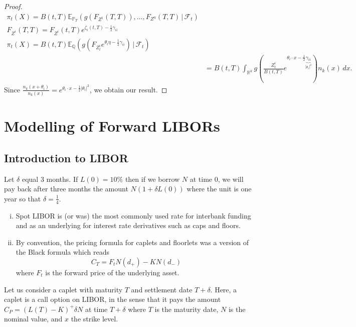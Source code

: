 \documentclass[10pt, oneside, reqno]{amsbook}
\theoremstyle{plain}%
\theoremstyle{definition}
\theoremstyle{remark}
\newcommand{\given}{ \, | \,}
\newcommand{\sigf}{\mathcal{F}}
\newcommand{\Q}{\mathbb{Q}}
\newcommand{\R}{\mathbb{R}}
\newcommand{\E}{\mathbb{E}}
\renewcommand{\P}{\mathbb{P}}
\numberwithin{equation}{chapter}
\begin{document}
\begin{proof}
	\begin{align*}
		\pi_t(X) = B(t, T) \E_{\P_T} \left( g(F_{Z^1}(T, T)), \dots, F_{Z^n}(T, T) \given \sigf_t \right) \\
		F_{Z^i}(T, T) = F_{Z^i}(t, T) e^{\zeta_i(t, T) - \frac{1}{2} \gamma_{ii}} \\
		\pi_t(X) = B(t, T) \E_\Q \left( g\left( F_{Z_t^i} e^{\theta_i \eta - \frac{1}{2} \gamma_{ii}} \right) \given \sigf_t \right) \\
		&= B(t, T) \int_{\R^k} g\left( \frac{Z^i_t}{B(t, T)} e^{\theta_i \cdot x - \frac{1}{2} \underbrace{\gamma_{ii}}_{|\theta_i|^2}} \right) n_k(x) \, dx.
	\end{align*}  Since $\frac{n_k(x + \theta_i)}{n_k(x)} = e^{\theta_i \cdot x - \frac{1}{2}|\theta_i|^2}$, we obtain our result.
\end{proof}

\chapter{Modelling of Forward LIBORs} %
\label{cha:modelling_of_forward_libors}
\section{Introduction to LIBOR} %
\label{sec:introduction}
Let $\delta$ equal 3 months.  If $L(0) = 10\%$ then if we borrow $N$ at time $0$, we will pay back after three months the amount $N(1 + \delta L(0))$ where the unit is one year so that $\delta = \frac{1}{4}$.

\begin{enumerate}[(i)]
	\item Spot LIBOR is (or was) the most commonly used rate for interbank funding and as an underlying for interest rate derivatives such as caps and floors.  
	\item By convention, the pricing formula for caplets and floorlets was a version of the Black formula which reads \[
		C_T = F_t N(d_+) - K N(d_-)
	\] where $F_t$ is the forward price of the underlying asset. 
\end{enumerate}


Let us consider a caplet with maturity $T$ and settlement date $T + \delta$.  Here, a caplet is a call option on LIBOR, in the sense that it pays the amount $C_P = (L(T) - K)^+ \delta N$ at time $T + \delta$ where $T$ is the maturity date, $N$ is the nominal value, and $x$ the strike level.  
\end{document}
